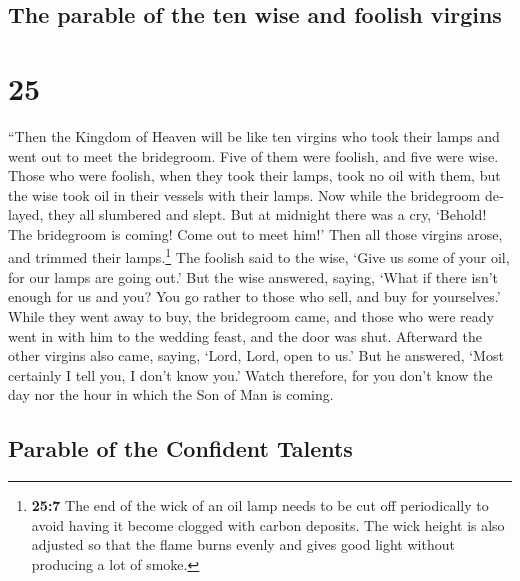 \begin{paracol}{2}
\begin{otherlanguage}{english}
\hypertarget{the-parable-of-the-ten-wise-and-foolish-virgins}{%
\subsection{The parable of the ten wise and foolish
virgins}\label{the-parable-of-the-ten-wise-and-foolish-virgins}}

\hypertarget{section-49}{%
\section{25}\label{section-49}}

 ``Then the Kingdom of Heaven will be like ten virgins who
took their lamps and went out to meet the bridegroom. 
Five of them were foolish, and five were wise.  Those who
were foolish, when they took their lamps, took no oil with them,
 but the wise took oil in their vessels with their lamps.
 Now while the bridegroom delayed, they all slumbered and
slept.  But at midnight there was a cry, `Behold! The
bridegroom is coming! Come out to meet him!'  Then all
those virgins arose, and trimmed their lamps.\footnote{\textbf{25:7} The
  end of the wick of an oil lamp needs to be cut off periodically to
  avoid having it become clogged with carbon deposits. The wick height
  is also adjusted so that the flame burns evenly and gives good light
  without producing a lot of smoke.}  The foolish said to
the wise, `Give us some of your oil, for our lamps are going out.'
 But the wise answered, saying, `What if there isn't
enough for us and you? You go rather to those who sell, and buy for
yourselves.'  While they went away to buy, the bridegroom
came, and those who were ready went in with him to the wedding feast,
and the door was shut.  Afterward the other virgins also
came, saying, `Lord, Lord, open to us.'  But he answered,
`Most certainly I tell you, I don't know you.'  Watch
therefore, for you don't know the day nor the hour in which the Son of
Man is coming.

\hypertarget{parable-of-the-confident-talents}{%
\subsection{Parable of the Confident
Talents}\label{parable-of-the-confident-talents}}


\end{otherlanguage}
\end{paracol}
